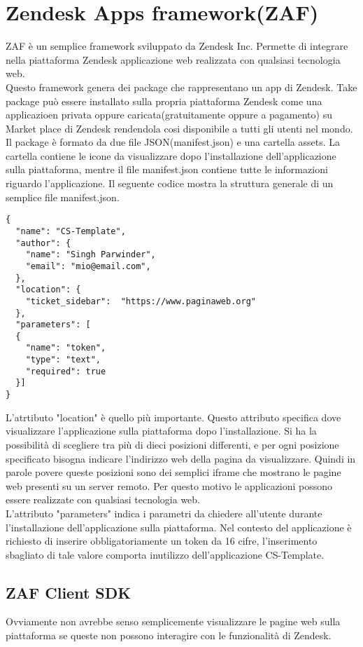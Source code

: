 \section{Zendesk Apps framework(ZAF)}
ZAF è un semplice framework sviluppato da Zendesk Inc. Permette di integrare nella piattaforma Zendesk applicazione web realizzata con qualsiasi tecnologia web. 
\\

Questo framework genera dei package che rappresentano un app di Zendesk.
Take package può essere installato sulla propria piattaforma Zendesk come una applicazioen privata oppure caricata(gratuitamente oppure a pagamento) su Market place di Zendesk rendendola cosi disponibile a tutti gli utenti nel mondo. Il package è formato da due file JSON(manifest.json) e una cartella assets. La cartella contiene le icone da visualizzare dopo l'installazione dell'applicazione sulla piattaforma, mentre il file manifest.json contiene tutte le informazioni riguardo l'applicazione. Il seguente codice mostra la struttura generale di un semplice file manifest.json. \\
\begin{lstlisting}
{
  "name": "CS-Template",
  "author": {
	"name": "Singh Parwinder",
	"email": "mio@email.com",
  },
  "location": {
	"ticket_sidebar":  "https://www.paginaweb.org"
  },	
  "parameters": [
  {
    "name": "token",
	"type": "text",
	"required": true
  }]
}
\end{lstlisting}
L'atrtibuto "location" è quello più importante. Questo attributo specifica dove visualizzare l'applicazione sulla piattaforma dopo l'installazione. Si ha la possibilità di scegliere tra più di dieci posizioni differenti, e per ogni posizione specificato bisogna indicare l'indirizzo web della pagina da visualizzare. Quindi in parole povere queste posizioni sono dei semplici iframe che mostrano le pagine web presenti su un server remoto.   Per questo motivo le applicazioni possono essere realizzate con qualsiasi tecnologia web. 
\\

L'attributo "parameters" indica i parametri da chiedere all'utente durante l'installazione dell'applicazione sulla piattaforma. Nel contesto del applicazione è richiesto di inserire obbligatoriamente un token da 16 cifre, l'inserimento sbagliato di tale valore comporta inutilizzo dell'applicazione CS-Template. 

\subsection{ZAF Client SDK}
Ovviamente non avrebbe senso semplicemente visualizzare le pagine web sulla piattaforma se queste non possono interagire con le funzionalità di Zendesk. 
\\

